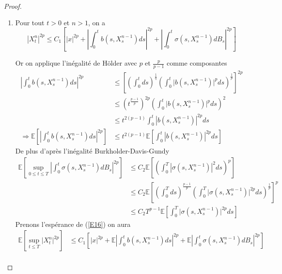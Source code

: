 \documentclass[A4paper,12pt]{report}
\newcommand{\E}{{\mathbb{E}}}
\begin{document}
\begin{proof}
\begin{enumerate}

\item Pour tout $t>0$ et $n>1$, on a 
\begin{equation}\label{E16}
\left|X_{t}^{n}\right|^{2 p} \leq C_{1}\left[|x|^{2 p}+\left|\int_{0}^{t} b\left(s, X_{s}^{n-1}\right) d s\right|^{2 p}+\left|\int_{0}^{t} \sigma\left(s, X_{s}^{n-1}\right) d B_{s}\right|^{2 p}\right]
\end{equation}

Or on applique l'inégalité de Hölder  avec $p$ et $\frac{p}{p-1}$ comme composantes
\begin{align*}
\left|\int_{0}^{t} b\left(s, X_{s}^{n-1}\right) d s\right|^{2 p} &\leq \left[\left(\int_0 ^t ds\right)^{\frac{1}{q}}\left(\int_{0}^{t} \lvert b(s, X_{s}^{n-1}) \rvert ^p d s\right)^\frac{1}{p}\right]^{2p}\\
&\leq \left(t^{\frac{p-1}{p}}\right)^{2p}\left(\int_{0}^{t}\lvert b(s, X_{s}^{n-1})\rvert^p d s\right)^{2}\\
&\leq t^{2(p-1)} \int_{0}^{t}\left|b\left(s, X_{s}^{n-1}\right)\right|^{2 p} d s \\
\Rightarrow \E \left[ \left|\int_{0}^{t} b\left(s, X_{s}^{n-1}\right) d s\right|^{2 p} \right] &\leq t^{2(p-1)} \E\left[\int_{0}^{t}\left|b\left(s, X_{s}^{n-1}\right)\right|^{2 p} d s \right]
\end{align*}
De plus d'après l'inégalité Burkholder-Davis-Gundy
\begin{align*}
\E\left[\sup _{0 \leq t \leq T}\left|\int_{0}^{t} \sigma\left(s, X_{s}^{n-1}\right) d B_{s}\right|^{2 p}\right] &\leq C_{2} \E\left[\left(\int_{0}^{T}\left|\sigma\left(s, X_{s}^{n-1}\right)\right|^{2} d s\right)^{p}\right]\\
&\leq C_{2} \E\left[\left(\int_{0}^{T}ds \right)^{\frac{p-1}{p}} \left(\int_{0}^{T}\lvert \sigma\left(s, X_{s}^{n-1}\right)\rvert^{2 p} d s\right)^\frac{1}{p} \right]^p\\
& \leq C_{2} T^{p-1} \E \left[\int_{0}^{T} \lvert \sigma(s, X_{s}^{n-1}) \rvert^{2p} ds \right]
\end{align*}
Prenons l'espérance de (\ref{E16}) on aura 
\begin{align*}
\E\left[\sup_{t \leq T}\lvert X_{t}^{n}\rvert^{2 p}\right] &\leq C_{1}\left[|x|^{2 p}+\E\left|\int_{0}^{t} b\left(s, X_{s}^{n-1}\right) d s\right|^{2 p}+\E\left|\int_{0}^{t} \sigma\left(s, X_{s}^{n-1}\right) d B_{s}\right|^{2 p}\right]\\

\end{align*}
\end{enumerate}
\end{proof}
\end{document}
